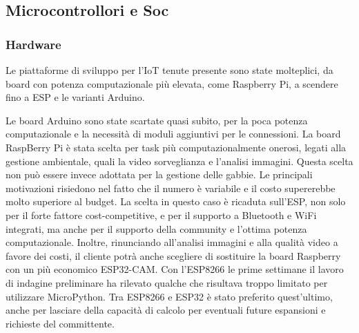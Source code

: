         \subsection{Microcontrollori e Soc}
        \subsubsection{Hardware}
        Le piattaforme di sviluppo per l'IoT tenute presente sono state molteplici, da board con potenza computazionale più elevata, come Raspberry Pi, a scendere fino a ESP e le varianti Arduino. 
        
        Le board Arduino sono state scartate quasi subito, per la poca potenza computazionale e la necessità di moduli aggiuntivi per le connessioni. 
        La board RaspBerry Pi è stata scelta per task più computazionalmente onerosi, legati alla gestione ambientale, quali la video sorveglianza e l'analisi immagini. 
        Questa scelta non può essere invece adottata per la gestione delle gabbie. Le principali motivazioni risiedono nel fatto che il numero è variabile e il costo supererebbe molto superiore al budget. 
        La scelta in questo caso è ricaduta sull'ESP, non solo per il forte fattore cost-competitive, e per il supporto a Bluetooth e WiFi integrati, ma anche per il supporto della community e l'ottima potenza computazionale. Inoltre, rinunciando all'analisi immagini e alla qualità video a favore dei costi, il cliente potrà anche scegliere di sostituire la board Raspberry con un più economico ESP32-CAM.
        Con l'ESP8266 le prime settimane il lavoro di indagine preliminare ha rilevato qualche che risultava troppo limitato per utilizzare MicroPython.
        Tra ESP8266 e ESP32 è stato preferito quest'ultimo, anche per lasciare della capacità di calcolo per eventuali future espansioni e richieste del committente. 
